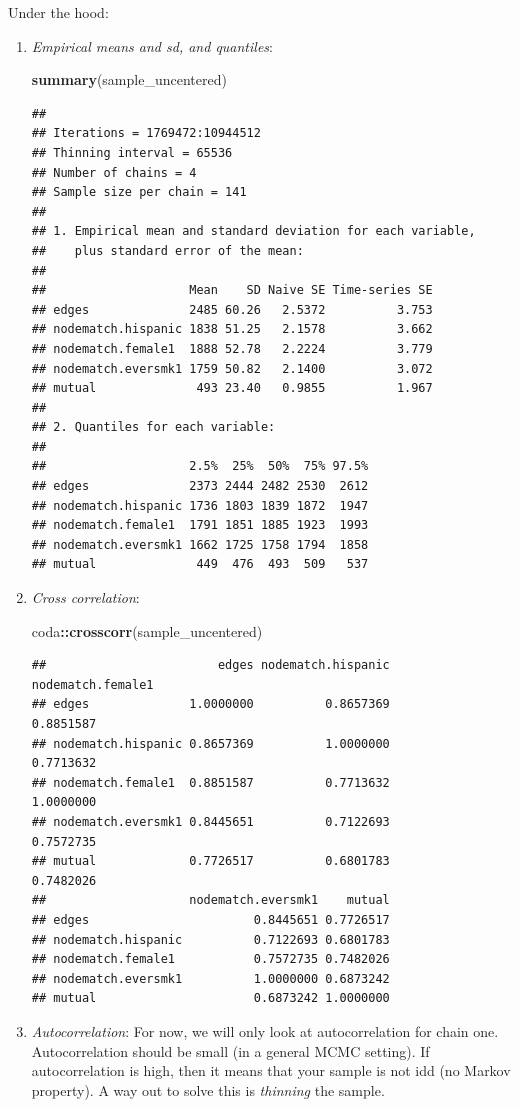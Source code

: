 \documentclass[
]{book}
\newenvironment{Shaded}{\begin{snugshade}}{\end{snugshade}}
\newcommand{\FunctionTok}[1]{\textcolor[rgb]{0.13,0.29,0.53}{\textbf{#1}}}
\newcommand{\NormalTok}[1]{#1}
\newcommand{\SpecialCharTok}[1]{\textcolor[rgb]{0.81,0.36,0.00}{\textbf{#1}}}
\begin{document}
Under the hood:

\begin{enumerate}
\def\labelenumi{\arabic{enumi}.}
\item
  \emph{Empirical means and sd, and quantiles}:

\begin{Shaded}
\begin{Highlighting}[]
\FunctionTok{summary}\NormalTok{(sample\_uncentered)}
\end{Highlighting}
\end{Shaded}

\begin{verbatim}
## 
## Iterations = 1769472:10944512
## Thinning interval = 65536 
## Number of chains = 4 
## Sample size per chain = 141 
## 
## 1. Empirical mean and standard deviation for each variable,
##    plus standard error of the mean:
## 
##                    Mean    SD Naive SE Time-series SE
## edges              2485 60.26   2.5372          3.753
## nodematch.hispanic 1838 51.25   2.1578          3.662
## nodematch.female1  1888 52.78   2.2224          3.779
## nodematch.eversmk1 1759 50.82   2.1400          3.072
## mutual              493 23.40   0.9855          1.967
## 
## 2. Quantiles for each variable:
## 
##                    2.5%  25%  50%  75% 97.5%
## edges              2373 2444 2482 2530  2612
## nodematch.hispanic 1736 1803 1839 1872  1947
## nodematch.female1  1791 1851 1885 1923  1993
## nodematch.eversmk1 1662 1725 1758 1794  1858
## mutual              449  476  493  509   537
\end{verbatim}
\item
  \emph{Cross correlation}:

\begin{Shaded}
\begin{Highlighting}[]
\NormalTok{coda}\SpecialCharTok{::}\FunctionTok{crosscorr}\NormalTok{(sample\_uncentered)}
\end{Highlighting}
\end{Shaded}

\begin{verbatim}
##                        edges nodematch.hispanic nodematch.female1
## edges              1.0000000          0.8657369         0.8851587
## nodematch.hispanic 0.8657369          1.0000000         0.7713632
## nodematch.female1  0.8851587          0.7713632         1.0000000
## nodematch.eversmk1 0.8445651          0.7122693         0.7572735
## mutual             0.7726517          0.6801783         0.7482026
##                    nodematch.eversmk1    mutual
## edges                       0.8445651 0.7726517
## nodematch.hispanic          0.7122693 0.6801783
## nodematch.female1           0.7572735 0.7482026
## nodematch.eversmk1          1.0000000 0.6873242
## mutual                      0.6873242 1.0000000
\end{verbatim}
\item
  \emph{Autocorrelation}: For now, we will only look at autocorrelation for chain one. Autocorrelation should be small (in a general MCMC setting). If autocorrelation is high, then it means that your sample is not idd (no Markov property). A way out to solve this is \emph{thinning} the sample.


\end{enumerate}
\end{document}
